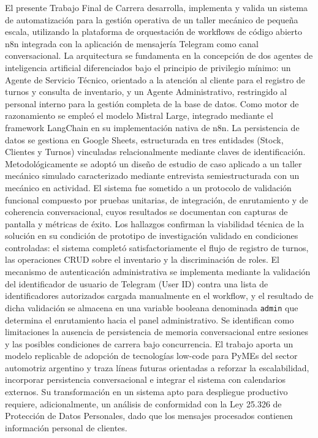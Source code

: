 \documentclass[12pt,a4paper]{report}
\begin{document}
El presente Trabajo Final de Carrera desarrolla, implementa y valida un sistema de automatización para la gestión operativa de un taller mecánico de pequeña escala, utilizando la plataforma de orquestación de workflows de código abierto n8n integrada con la aplicación de mensajería Telegram como canal conversacional. La arquitectura se fundamenta en la concepción de dos agentes de inteligencia artificial diferenciados bajo el principio de privilegio mínimo: un Agente de Servicio Técnico, orientado a la atención al cliente para el registro de turnos y consulta de inventario, y un Agente Administrativo, restringido al personal interno para la gestión completa de la base de datos. Como motor de razonamiento se empleó el modelo Mistral Large, integrado mediante el framework LangChain en su implementación nativa de n8n. La persistencia de datos se gestiona en Google Sheets, estructurada en tres entidades (Stock, Clientes y Turnos) vinculadas relacionalmente mediante claves de identificación. Metodológicamente se adoptó un diseño de estudio de caso aplicado a un taller mecánico simulado caracterizado mediante entrevista semiestructurada con un mecánico en actividad. El sistema fue sometido a un protocolo de validación funcional compuesto por pruebas unitarias, de integración, de enrutamiento y de coherencia conversacional, cuyos resultados se documentan con capturas de pantalla y métricas de éxito. Los hallazgos confirman la viabilidad técnica de la solución en su condición de prototipo de investigación validado en condiciones controladas: el sistema completó satisfactoriamente el flujo de registro de turnos, las operaciones CRUD sobre el inventario y la discriminación de roles. El mecanismo de autenticación administrativa se implementa mediante la validación del identificador de usuario de Telegram (User ID) contra una lista de identificadores autorizados cargada manualmente en el workflow, y el resultado de dicha validación se almacena en una variable booleana denominada \texttt{admin} que determina el enrutamiento hacia el panel administrativo. Se identifican como limitaciones la ausencia de persistencia de memoria conversacional entre sesiones y las posibles condiciones de carrera bajo concurrencia. El trabajo aporta un modelo replicable de adopción de tecnologías low-code para PyMEs del sector automotriz argentino y traza líneas futuras orientadas a reforzar la escalabilidad, incorporar persistencia conversacional e integrar el sistema con calendarios externos. Su transformación en un sistema apto para despliegue productivo requiere, adicionalmente, un análisis de conformidad con la Ley 25.326 de Protección de Datos Personales, dado que los mensajes procesados contienen información personal de clientes.
\end{document}
